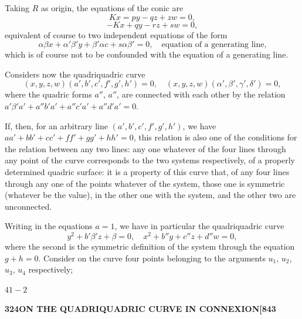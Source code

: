 \documentclass[12pt,a4paper]{article}
\theoremstyle{definition}
\begin{document}
Taking $R$ as origin, the equations of the conic are
\[
Kx = py - qz + zw = 0,
\]
\[
-Kx + qy - rz + sw = 0,
\]
equivalent of course to two independent equations of the form
\[
\alpha\beta x + \alpha'\beta'y + \beta'\alpha c + s\alpha\beta' = 0, \quad \text{equation of a generating line,}
\]
which is of course not to be confounded with the equation of a generating line.

Considers now the quadriquadric curve
\[
(x, y, z, w)(a', b', c', f', g', h') = 0, \quad (x, y, z, w)(\alpha', \beta', \gamma', \delta') = 0,
\]
where the quadric forms $a''$, $a''$, are connected with each other by the relation $a'\beta'a' + a''b'a' + a''c'a' + a''d'a' = 0$.

If, then, for an arbitrary line $(a', b', c', f', g', h')$, we have $aa' + bb' + cc' + ff' + gg' + hh' = 0$, this relation is also one of the conditions for the relation between any two lines: any one whatever of the four lines through any point of the curve corresponds to the two systems respectively, of a properly determined quadric surface: it is a property of this curve that, of any four lines through any one of the points whatever of the system, those one is symmetric (whatever be the value), in the other one with the system, and the other two are unconnected.

Writing in the equations $a = 1$, we have in particular the quadriquadric curve
\[
y^2 + b'\beta'z + \beta = 0, \quad x^2 + b''y + c''z + d''w = 0,
\]
where the second is the symmetric definition of the system through the equation $g + h = 0$. Consider on the curve four points belonging to the arguments $u_1$, $u_2$, $u_3$, $u_4$ respectively;

\hfill $41-2$

\newpage
\setcounter{page}{324}

\noindent\textbf{324}\hfill\textbf{ON THE QUADRIQUADRIC CURVE IN CONNEXION}\hfill\textbf{[843}

\bigskip
\end{document}

